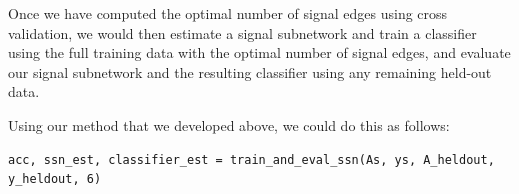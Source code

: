 Once we have computed the optimal number of signal edges using cross validation, we would then estimate a signal subnetwork and train a classifier using the full training data with the optimal number of signal edges, and evaluate our signal subnetwork and the resulting classifier using any remaining held-out data. 

Using our method that we developed above, we could do this as follows:

\begin{lstlisting}
acc, ssn_est, classifier_est = train_and_eval_ssn(As, ys, A_heldout, y_heldout, 6)
\end{lstlisting}
